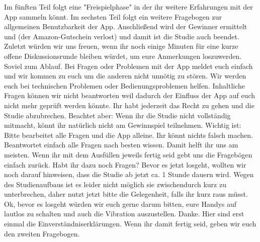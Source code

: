 Im f{\"u}nften Teil folgt eine "Freispielphase" in der ihr weitere Erfahrungen mit der App sammeln k{\"o}nnt.
Im sechsten Teil folgt ein weitere Fragebogen zur allgemeinen Benutzbarkeit der App.
Anschlie{\ss}end wird der Gewinner ermittelt und (der Amazon-Gutschein verlost) und damit ist die Studie auch beendet. Zuletzt w{\"u}rden wir uns freuen, wenn ihr noch einige Minuten f{\"u}r eine kurze offene Diskussionsrunde bleiben w{\"u}rdet, um eure Anmerkungen loszuwerden.
Soviel zum Ablauf.
\newline
\newline
Bei Fragen oder Problemen mit der App meldet euch einfach und wir kommen zu euch um die anderen nicht unn{\"o}tig zu st{\"o}ren. Wir werden euch bei technischen Problemen oder Bedienungsproblemen helfen. Inhaltliche Fragen k{\"o}nnen wir nicht beantworten weil dadurch der Einfluss der App auf euch nicht mehr gepr{\"u}ft werden k{\"o}nnte.
Ihr habt jederzeit das Recht zu gehen und die Studie abzubrechen. Beachtet aber: Wenn ihr die Studie nicht vollst{\"a}ndig mitmacht, k{\"o}nnt ihr nat{\"u}rlich nicht am Gewinnspiel teilnehmen.
\newline
\newline
Wichtig ist: Bitte bearbeitet alle Fragen und die App alleine. Ihr k{\"o}nnt nichts falsch machen. Beantwortet einfach alle Fragen nach besten wissen. Damit helft ihr uns am meisten. Wenn ihr mit dem Ausf{\"u}llen jeweils fertig seid gebt uns die Frageb{\"o}gen einfach zur{\"u}ck.
Habt ihr dazu noch Fragen?
\newline
\newline
Bevor es jetzt losgeht, wollten wir noch darauf hinweisen, dass die Studie ab jetzt ca. 1 Stunde dauern wird. Wegen des Studienaufbaus ist es leider nicht m{\"o}glich sie zwischendurch kurz zu unterbrechen, daher nutzt jetzt bitte die Gelegenheit, falls ihr kurz raus m{\"u}sst.
\newline
\newline
Ok, bevor es losgeht w{\"u}rden wir euch gerne darum bitten, eure Handys auf lautlos zu schalten und auch die Vibration auszustellen. Danke.
Hier sind erst einmal die Einverst{\"a}ndniserkl{\"a}rungen. Wenn ihr damit fertig seid, geben wir euch den zweiten Fragebogen.

